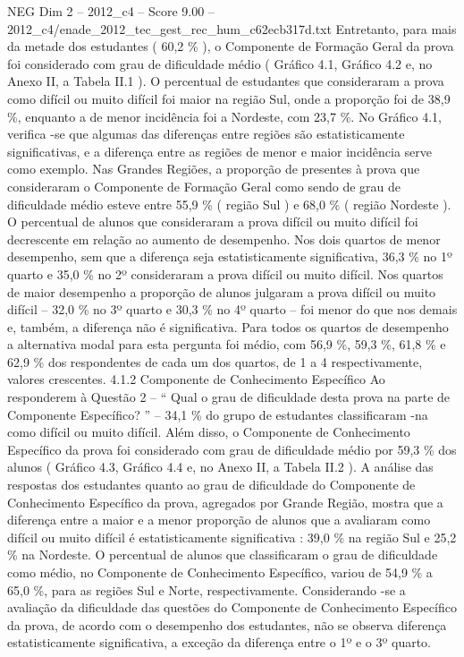 \begin{textsample}{NEG Dim 2 – 2012\_c4 – Score 9.00 – 2012\_c4/enade\_2012\_tec\_gest\_rec\_hum\_c62ecb317d.txt}
Entretanto, para mais da metade dos estudantes ( 60,2 \% ), o Componente de Formação Geral da prova foi considerado com grau de dificuldade médio ( Gráfico 4.1, Gráfico 4.2 e, no Anexo II, a Tabela II.1 ).
O percentual de estudantes que consideraram a prova como difícil ou muito difícil foi maior na região Sul, onde a proporção foi de 38,9 \%, enquanto a de menor incidência foi a Nordeste, com 23,7 \%.
No Gráfico 4.1, verifica -se que algumas das diferenças entre regiões são estatisticamente significativas, e a diferença entre as regiões de menor e maior incidência serve como exemplo.
Nas Grandes Regiões, a proporção de presentes à prova que consideraram o Componente de Formação Geral como sendo de grau de dificuldade médio esteve entre 55,9 \% ( região Sul ) e 68,0 \% ( região Nordeste ).
O percentual de alunos que consideraram a prova difícil ou muito difícil foi decrescente em relação ao aumento de desempenho.
Nos dois quartos de menor desempenho, sem que a diferença seja estatisticamente significativa, 36,3 \% no 1º quarto e 35,0 \% no 2º consideraram a prova difícil ou muito difícil.
Nos quartos de maior desempenho a proporção de alunos julgaram a prova difícil ou muito difícil – 32,0 \% no 3º quarto e 30,3 \% no 4º quarto – foi menor do que nos demais e, também, a diferença não é significativa.
Para todos os quartos de desempenho a alternativa modal para esta pergunta foi médio, com 56,9 \%, 59,3 \%, 61,8 \% e 62,9 \% dos respondentes de cada um dos quartos, de 1 a 4 respectivamente, valores crescentes. 4.1.2 Componente de Conhecimento Específico Ao responderem à Questão 2 – “ Qual o grau de dificuldade desta prova na parte de Componente Específico? ” – 34,1 \% do grupo de estudantes classificaram -na como difícil ou muito difícil.
Além disso, o Componente de Conhecimento Específico da prova foi considerado com grau de dificuldade médio por 59,3 \% dos alunos ( Gráfico 4.3, Gráfico 4.4 e, no Anexo II, a Tabela II.2 ).
A análise das respostas dos estudantes quanto ao grau de dificuldade do Componente de Conhecimento Específico da prova, agregados por Grande Região, mostra que a diferença entre a maior e a menor proporção de alunos que a avaliaram como difícil ou muito difícil é estatisticamente significativa : 39,0 \% na região Sul e 25,2 \% na Nordeste.
O percentual de alunos que classificaram o grau de dificuldade como médio, no Componente de Conhecimento Específico, variou de 54,9 \% a 65,0 \%, para as regiões Sul e Norte, respectivamente.
Considerando -se a avaliação da dificuldade das questões do Componente de Conhecimento Específico da prova, de acordo com o desempenho dos estudantes, não se observa diferença estatisticamente significativa, a exceção da diferença entre o 1º e o 3º quarto.

\end{textsample}
